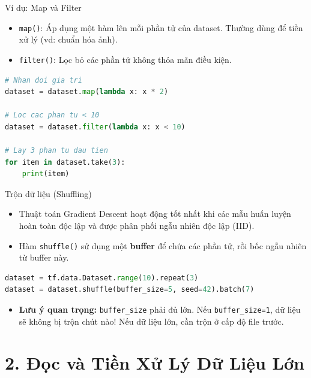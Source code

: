 \documentclass[aspectratio=169]{beamer}
\begin{document}
\begin{frame}[fragile]{Ví dụ: Map và Filter}
    \begin{itemize}
        \item \texttt{map()}: Áp dụng một hàm lên mỗi phần tử của dataset. Thường dùng để tiền xử lý (vd: chuẩn hóa ảnh).
        \item \texttt{filter()}: Lọc bỏ các phần tử không thỏa mãn điều kiện.
    \end{itemize}
\begin{lstlisting}[language=Python]
# Nhan doi gia tri
dataset = dataset.map(lambda x: x * 2)

# Loc cac phan tu < 10
dataset = dataset.filter(lambda x: x < 10)

# Lay 3 phan tu dau tien
for item in dataset.take(3):
    print(item)
\end{lstlisting}
\end{frame}

\begin{frame}[fragile]{Trộn dữ liệu (Shuffling)}
    \begin{itemize}
        \item Thuật toán Gradient Descent hoạt động tốt nhất khi các mẫu huấn luyện hoàn toàn độc lập và được phân phối ngẫu nhiên độc lập (IID).
        \item Hàm \texttt{shuffle()} sử dụng một \textbf{buffer} để chứa các phần tử, rồi bốc ngẫu nhiên từ buffer này.
    \end{itemize}
\begin{lstlisting}[language=Python]
dataset = tf.data.Dataset.range(10).repeat(3)
dataset = dataset.shuffle(buffer_size=5, seed=42).batch(7)
\end{lstlisting}
    \begin{itemize}
        \item \textbf{Lưu ý quan trọng:} \texttt{buffer\_size} phải đủ lớn. Nếu \texttt{buffer\_size=1}, dữ liệu sẽ không bị trộn chút nào! Nếu dữ liệu lớn, cần trộn ở cấp độ file trước.
    \end{itemize}
\end{frame}

\section{2. Đọc và Tiền Xử Lý Dữ Liệu Lớn}
\end{document}
